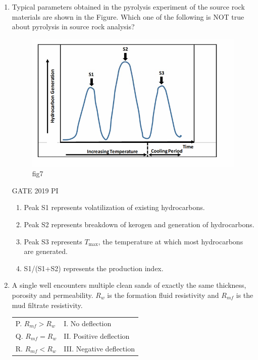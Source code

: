 \documentclass[journal,12pt,onecolumn]{IEEEtran}
\theoremstyle{remark}
\begin{document}
\begin{enumerate}
\begin{multicols}{2}
\begin{enumerate}
    \item S1-P, S2-Q, S3-R
    \item S1-R, S2-P, S3-Q
    \item S1-P, S2-R, S3-Q
    \item S1-R, S2-Q, S3-P
\end{enumerate}
\end{multicols}
\item Typical parameters obtained in the pyrolysis experiment of the source rock materials are shown in the Figure. Which one of the following is NOT true about pyrolysis in source rock analysis?
\begin{figure}[H]
    \centering
    \includegraphics[width=0.5\linewidth]{figs/Q.33.png}
    \caption{fig7}
    \label{fig:figs/Q.33.png}
\end{figure}
\hfill{GATE 2019 PI}

\begin{multicols}{2}
\begin{enumerate}
    \item Peak S1 represents volatilization of existing hydrocarbons.
    \item Peak S2 represents breakdown of kerogen and generation of hydrocarbons.
    \item Peak S3 represents $T_{\text{max}}$, the temperature at which most hydrocarbons are generated.
    \item S1/(S1+S2) represents the production index.
\end{enumerate}
\end{multicols}
\item A single well encounters multiple clean sands of exactly the same thickness, porosity and permeability. $R_w$ is the formation fluid resistivity and $R_{mf}$ is the mud filtrate resistivity.

\begin{tabular}{ll}
P. $R_{mf} > R_w$ & I. No deflection \\
Q. $R_{mf} = R_w$ & II. Positive deflection \\
R. $R_{mf} < R_w$ & III. Negative deflection \\
\end{tabular}


\end{enumerate}
\end{document}

